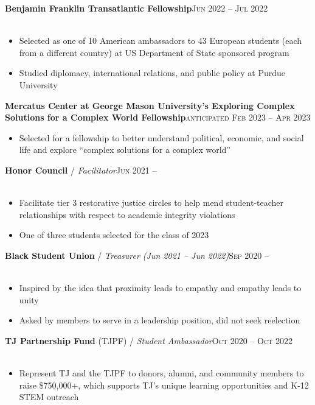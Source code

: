 \documentclass[12pt, a4paper]{article}
\begin{document}
\textbf{Benjamin Franklin Transatlantic Fellowship}\hfill\textsc{Jun 2022 -- Jul 2022}\\\
\begin{itemize}
    \vspace{-8mm}
    \item Selected as one of 10 American ambassadors to 43 European students (each from a different country) at US Department of State sponsored program
    \item Studied diplomacy, international relations, and public policy at Purdue University
\end{itemize}

\textbf{Mercatus Center at George Mason University’s Exploring Complex Solutions for a Complex World Fellowship}\hfill\textsc{anticipated Feb 2023 -- Apr 2023}\\
\begin{itemize}
    \vspace{-8mm}
    \item Selected for a fellowship to better understand political, economic, and social life and explore ``complex solutions for a complex world''
\end{itemize}

\textbf{Honor Council} / \textit{Facilitator}\hfill\textsc{Jun 2021 --}\\\
\begin{itemize}
    \vspace{-8mm}
    \item Facilitate tier 3 restorative justice circles to help mend student-teacher relationships with respect to academic integrity violations
    \item One of three students selected for the class of 2023
\end{itemize}

\textbf{Black Student Union} / \textit{Treasurer (Jun 2021 -- Jun 2022)}\hfill\textsc{Sep 2020 --}\\\
\begin{itemize}
    \vspace{-8mm}
    \item Inspired by the idea that proximity leads to empathy and empathy leads to unity
    \item Asked by members to serve in a leadership position, did not seek reelection
\end{itemize}

\textbf{TJ Partnership Fund} (TJPF) / \textit{Student Ambassador}\hfill\textsc{Oct 2020 -- Oct 2022}\\\
\begin{itemize}
    \vspace{-8mm}
    \item Represent TJ and the TJPF to donors, alumni, and community members to raise \$750,000+, which supports TJ's unique learning opportunities and K-12 STEM outreach
\end{itemize}
\end{document}
